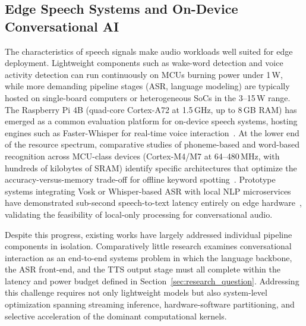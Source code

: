 \subsection{Edge Speech Systems and On-Device Conversational AI}
The characteristics of speech signals make audio workloads well suited for edge
deployment. Lightweight components such as wake-word detection and voice activity
detection can run continuously on MCUs burning power under 1\,W, while more demanding
pipeline stages (ASR, language modeling) are typically hosted on single-board
computers or heterogeneous SoCs in the 3--15\,W range. The Raspberry Pi 4B
(quad-core Cortex-A72 at 1.5\,GHz, up to 8\,GB RAM) has emerged as a common
evaluation platform for on-device speech systems, hosting engines such as
Faster-Whisper for real-time voice interaction~\cite{10.1145/3776942.3776981}. At the
lower end of the resource spectrum, comparative studies of phoneme-based and
word-based recognition across MCU-class devices (Cortex-M4/M7 at 64--480\,MHz, with
hundreds of kilobytes of SRAM) identify specific architectures that optimize the
accuracy-versus-memory trade-off for offline keyword spotting~\cite{10711025}.
Prototype systems integrating Vosk or Whisper-based ASR with local NLP microservices
have demonstrated sub-second speech-to-text latency entirely on edge
hardware~\cite{info16080685}, validating the feasibility of local-only processing for
conversational audio.

Despite this progress, existing works have largely addressed individual pipeline
components in isolation. Comparatively little research examines conversational
interaction as an end-to-end systems problem in which the language backbone, the ASR
front-end, and the TTS output stage must all complete within the latency and power
budget defined in Section~\ref{sec:research_question}. Addressing this challenge
requires not only lightweight models but also system-level optimization spanning
streaming inference, hardware-software partitioning, and selective acceleration of
the dominant computational kernels.

